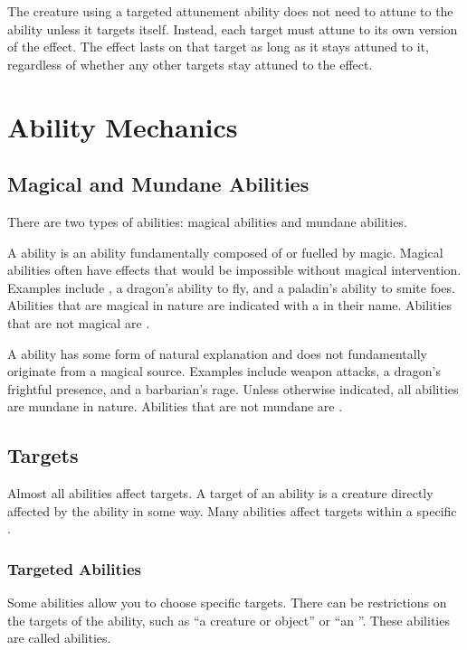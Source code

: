         The creature using a targeted attunement ability does not need to attune to the ability unless it targets itself.
        Instead, each target must attune to its own version of the effect.
        The effect lasts on that target as long as it stays attuned to it, regardless of whether any other targets stay attuned to the effect.

\section{Ability Mechanics}\label{Ability Mechanics}

    \subsection{Magical and Mundane Abilities}\label{Magical and Mundane Abilities}

        There are two types of abilities: magical abilities and mundane abilities.

        \label{Magical Abilities} A \magical ability is an ability fundamentally composed of or fuelled by magic.
        Magical abilities often have effects that would be impossible without magical intervention.
        Examples include , a dragon's ability to fly, and a paladin's ability to smite foes.
        Abilities that are magical in nature are indicated with a \sparklespaceless in their name.
        Abilities that are not magical are .

        \label{Mundane Abilities} A  ability has some form of natural explanation and does not fundamentally originate from a magical source.
        Examples include weapon attacks, a dragon's frightful presence, and a barbarian's rage.
        Unless otherwise indicated, all abilities are mundane in nature.
        Abilities that are not mundane are \magical.

    \subsection{Targets}\label{Targets}
        Almost all abilities affect targets.
        A target of an ability is a creature directly affected by the ability in some way.
        Many abilities affect targets within a specific .

        \subsubsection{Targeted Abilities}\label{Targeted Abilities}
            Some abilities allow you to choose specific targets.
            There can be restrictions on the targets of the ability, such as ``a creature or object'' or ``an ''.
            These abilities are called  abilities.

